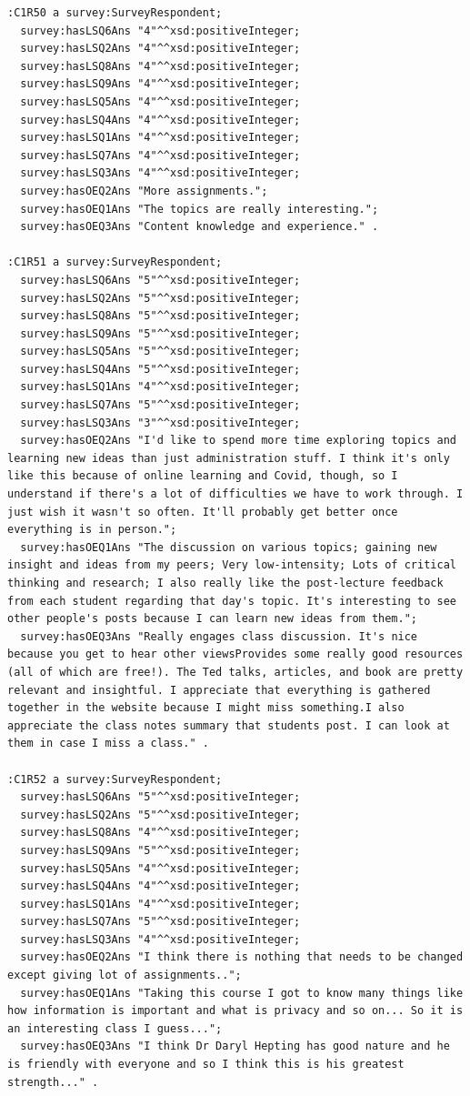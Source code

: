 \begin{lstlisting}
:C1R50 a survey:SurveyRespondent;
  survey:hasLSQ6Ans "4"^^xsd:positiveInteger;
  survey:hasLSQ2Ans "4"^^xsd:positiveInteger;
  survey:hasLSQ8Ans "4"^^xsd:positiveInteger;
  survey:hasLSQ9Ans "4"^^xsd:positiveInteger;
  survey:hasLSQ5Ans "4"^^xsd:positiveInteger;
  survey:hasLSQ4Ans "4"^^xsd:positiveInteger;
  survey:hasLSQ1Ans "4"^^xsd:positiveInteger;
  survey:hasLSQ7Ans "4"^^xsd:positiveInteger;
  survey:hasLSQ3Ans "4"^^xsd:positiveInteger;
  survey:hasOEQ2Ans "More assignments.";
  survey:hasOEQ1Ans "The topics are really interesting.";
  survey:hasOEQ3Ans "Content knowledge and experience." .

:C1R51 a survey:SurveyRespondent;
  survey:hasLSQ6Ans "5"^^xsd:positiveInteger;
  survey:hasLSQ2Ans "5"^^xsd:positiveInteger;
  survey:hasLSQ8Ans "5"^^xsd:positiveInteger;
  survey:hasLSQ9Ans "5"^^xsd:positiveInteger;
  survey:hasLSQ5Ans "5"^^xsd:positiveInteger;
  survey:hasLSQ4Ans "5"^^xsd:positiveInteger;
  survey:hasLSQ1Ans "4"^^xsd:positiveInteger;
  survey:hasLSQ7Ans "5"^^xsd:positiveInteger;
  survey:hasLSQ3Ans "3"^^xsd:positiveInteger;
  survey:hasOEQ2Ans "I'd like to spend more time exploring topics and learning new ideas than just administration stuff. I think it's only like this because of online learning and Covid, though, so I understand if there's a lot of difficulties we have to work through. I just wish it wasn't so often. It'll probably get better once everything is in person.";
  survey:hasOEQ1Ans "The discussion on various topics; gaining new insight and ideas from my peers; Very low-intensity; Lots of critical thinking and research; I also really like the post-lecture feedback from each student regarding that day's topic. It's interesting to see other people's posts because I can learn new ideas from them.";
  survey:hasOEQ3Ans "Really engages class discussion. It's nice because you get to hear other viewsProvides some really good resources (all of which are free!). The Ted talks, articles, and book are pretty relevant and insightful. I appreciate that everything is gathered together in the website because I might miss something.I also appreciate the class notes summary that students post. I can look at them in case I miss a class." .

:C1R52 a survey:SurveyRespondent;
  survey:hasLSQ6Ans "5"^^xsd:positiveInteger;
  survey:hasLSQ2Ans "5"^^xsd:positiveInteger;
  survey:hasLSQ8Ans "4"^^xsd:positiveInteger;
  survey:hasLSQ9Ans "5"^^xsd:positiveInteger;
  survey:hasLSQ5Ans "4"^^xsd:positiveInteger;
  survey:hasLSQ4Ans "4"^^xsd:positiveInteger;
  survey:hasLSQ1Ans "4"^^xsd:positiveInteger;
  survey:hasLSQ7Ans "5"^^xsd:positiveInteger;
  survey:hasLSQ3Ans "4"^^xsd:positiveInteger;
  survey:hasOEQ2Ans "I think there is nothing that needs to be changed except giving lot of assignments..";
  survey:hasOEQ1Ans "Taking this course I got to know many things like how information is important and what is privacy and so on... So it is an interesting class I guess...";
  survey:hasOEQ3Ans "I think Dr Daryl Hepting has good nature and he is friendly with everyone and so I think this is his greatest strength..." .


\end{lstlisting}
